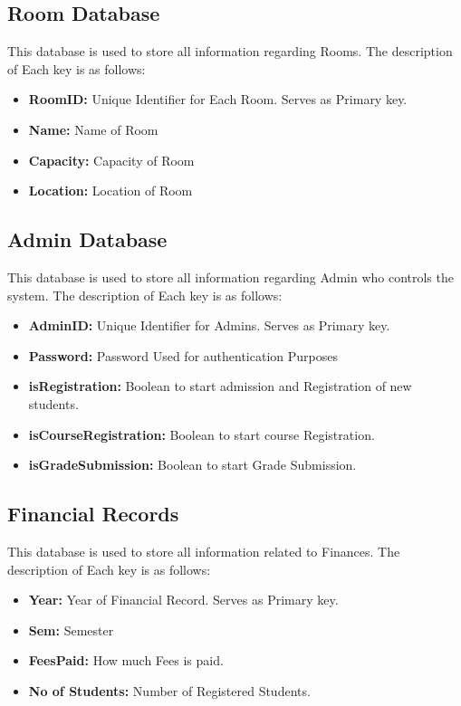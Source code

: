 \documentclass[12pt,a4paper]{article}
\begin{document}
     \subsection{Room Database}
        This database is used to store all information regarding Rooms. The description of Each key is as follows:
        \begin{itemize}
       \item \textbf{RoomID:} Unique Identifier for Each Room. Serves as Primary key.
        \item  \textbf{Name:} Name of Room
        \item  \textbf{Capacity:} Capacity of Room
        \item  \textbf{Location:} Location of Room
    \end{itemize}
    \subsection{Admin Database}
        This database is used to store all information regarding Admin who controls the system. The description of Each key is as follows:
        \begin{itemize}
       \item \textbf{AdminID:} Unique Identifier for Admins. Serves as Primary key.
        \item  \textbf{Password:} Password Used for authentication Purposes
        \item  \textbf{isRegistration:} Boolean to start admission and Registration of new students.
        \item  \textbf{isCourseRegistration:} Boolean to start course Registration.
        \item  \textbf{isGradeSubmission:} Boolean to start Grade Submission.
    \end{itemize}
    \subsection{Financial Records}
        This database is used to store all information related to Finances. The description of Each key is as follows:
        \begin{itemize}
       \item \textbf{Year:} Year of Financial Record. Serves as Primary key.
        \item  \textbf{Sem:} Semester
        \item  \textbf{FeesPaid:} How much Fees is paid.
        \item  \textbf{No of Students:} Number of Registered Students.
    \end{itemize}
    
\end{document}
